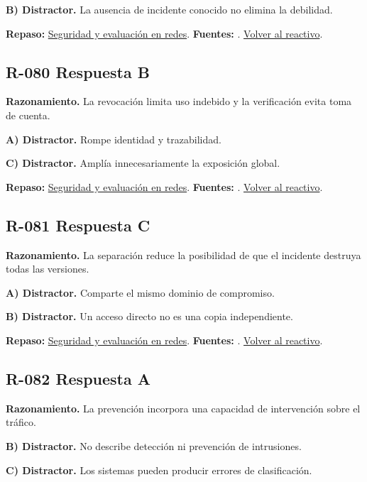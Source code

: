 \textbf{B) Distractor. }La ausencia de incidente conocido no elimina la debilidad.

\textbf{Repaso:} \hyperref[sec:r3]{Seguridad y evaluación en redes}. \textbf{Fuentes:} \cite{nistsecurity,owasp,aes,tls}. \hyperref[q:R-079]{Volver al reactivo}.\par\medskip

\subsection*{R-080 \quad Respuesta B}\label{s:R-080}
\textbf{Razonamiento.} La revocación limita uso indebido y la verificación evita toma de cuenta.

\textbf{A) Distractor. }Rompe identidad y trazabilidad.

\textbf{C) Distractor. }Amplía innecesariamente la exposición global.

\textbf{Repaso:} \hyperref[sec:r3]{Seguridad y evaluación en redes}. \textbf{Fuentes:} \cite{nistsecurity,owasp,aes,tls}. \hyperref[q:R-080]{Volver al reactivo}.\par\medskip

\subsection*{R-081 \quad Respuesta C}\label{s:R-081}
\textbf{Razonamiento.} La separación reduce la posibilidad de que el incidente destruya todas las versiones.

\textbf{A) Distractor. }Comparte el mismo dominio de compromiso.

\textbf{B) Distractor. }Un acceso directo no es una copia independiente.

\textbf{Repaso:} \hyperref[sec:r3]{Seguridad y evaluación en redes}. \textbf{Fuentes:} \cite{nistsecurity,owasp,aes,tls}. \hyperref[q:R-081]{Volver al reactivo}.\par\medskip

\subsection*{R-082 \quad Respuesta A}\label{s:R-082}
\textbf{Razonamiento.} La prevención incorpora una capacidad de intervención sobre el tráfico.

\textbf{B) Distractor. }No describe detección ni prevención de intrusiones.

\textbf{C) Distractor. }Los sistemas pueden producir errores de clasificación.

